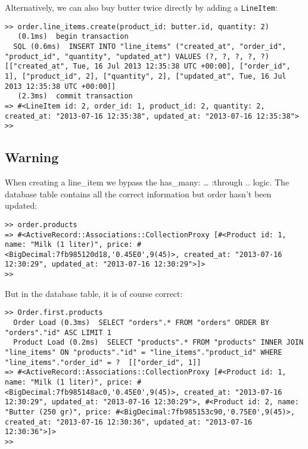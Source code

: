 \documentclass[a4paper]{book}
\newcounter{tab}[chapter]
\begin{document}
Alternatively, we can also buy butter twice directly by adding a \texttt{LineItem}:

\begin{shaded}\begin{verbatim}
>> order.line_items.create(product_id: butter.id, quantity: 2)
   (0.1ms)  begin transaction
  SQL (0.6ms)  INSERT INTO "line_items" ("created_at", "order_id", "product_id", "quantity", "updated_at") VALUES (?, ?, ?, ?, ?)  [["created_at", Tue, 16 Jul 2013 12:35:38 UTC +00:00], ["order_id", 1], ["product_id", 2], ["quantity", 2], ["updated_at", Tue, 16 Jul 2013 12:35:38 UTC +00:00]]
   (2.3ms)  commit transaction
=> #<LineItem id: 2, order_id: 1, product_id: 2, quantity: 2, created_at: "2013-07-16 12:35:38", updated_at: "2013-07-16 12:35:38">
>>
\end{verbatim}\end{shaded}

\subsection{Warning}\label{warning-3}

When creating a line\_item we bypass the has\_many: \ldots{} :through .. logic. The database table contains all the correct information but order hasn't been updated:

\begin{shaded}\begin{verbatim}
>> order.products
=> #<ActiveRecord::Associations::CollectionProxy [#<Product id: 1, name: "Milk (1 liter)", price: #<BigDecimal:7fb985120d18,'0.45E0',9(45)>, created_at: "2013-07-16 12:30:29", updated_at: "2013-07-16 12:30:29">]>
>>
\end{verbatim}\end{shaded}

But in the database table, it is of course correct:

\begin{shaded}\begin{verbatim}
>> Order.first.products
  Order Load (0.3ms)  SELECT "orders".* FROM "orders" ORDER BY "orders"."id" ASC LIMIT 1
  Product Load (0.2ms)  SELECT "products".* FROM "products" INNER JOIN "line_items" ON "products"."id" = "line_items"."product_id" WHERE "line_items"."order_id" = ?  [["order_id", 1]]
=> #<ActiveRecord::Associations::CollectionProxy [#<Product id: 1, name: "Milk (1 liter)", price: #<BigDecimal:7fb985148ac0,'0.45E0',9(45)>, created_at: "2013-07-16 12:30:29", updated_at: "2013-07-16 12:30:29">, #<Product id: 2, name: "Butter (250 gr)", price: #<BigDecimal:7fb985153c90,'0.75E0',9(45)>, created_at: "2013-07-16 12:30:36", updated_at: "2013-07-16 12:30:36">]>
>>
\end{verbatim}\end{shaded}
\end{document}
